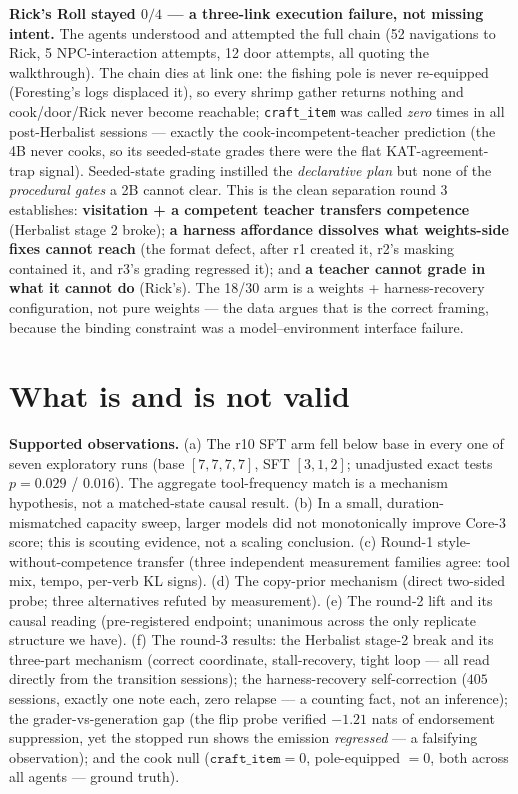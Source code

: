 \documentclass[11pt]{article}
\begin{document}
\textbf{Rick's Roll stayed $0/4$ --- a three-link execution failure, not missing intent.} The
agents understood and attempted the full chain (52 navigations to Rick, 5 NPC-interaction
attempts, 12 door attempts, all quoting the walkthrough). The chain dies at link one: the fishing
pole is never re-equipped (Foresting's logs displaced it), so every shrimp gather returns nothing
and cook/door/Rick never become reachable; \texttt{craft\_item} was called \emph{zero} times in
all post-Herbalist sessions --- exactly the cook-incompetent-teacher prediction (the 4B never
cooks, so its seeded-state grades there were the flat KAT-agreement-trap signal). Seeded-state
grading instilled the \emph{declarative plan} but none of the \emph{procedural gates} a 2B
cannot clear. This is the clean separation round 3 establishes: \textbf{visitation + a competent
teacher transfers competence} (Herbalist stage 2 broke); \textbf{a harness affordance dissolves
what weights-side fixes cannot reach} (the format defect, after r1 created it, r2's masking
contained it, and r3's grading regressed it); and \textbf{a teacher cannot grade in what it
cannot do} (Rick's). The 18/30 arm is a weights + harness-recovery configuration, not pure
weights --- the data argues that is the correct framing, because the binding constraint was a
model--environment interface failure.

\section{What is and is not valid}

\textbf{Supported observations.} (a) The r10 SFT arm fell below base in every one of seven
exploratory runs (base $[7,7,7,7]$, SFT $[3,1,2]$; unadjusted exact tests
$p{=}0.029$ / $0.016$). The aggregate tool-frequency match is a mechanism hypothesis, not a
matched-state causal result. (b) In a small, duration-mismatched capacity sweep, larger models did
not monotonically improve Core-3 score; this is scouting evidence, not a scaling conclusion.
(c) Round-1 style-without-competence transfer (three
independent measurement families agree: tool mix, tempo, per-verb KL signs). (d) The copy-prior
mechanism (direct two-sided probe; three alternatives refuted by measurement). (e) The round-2
lift and its causal reading (pre-registered endpoint; unanimous across the only replicate
structure we have). (f) The round-3 results: the Herbalist stage-2 break and its three-part
mechanism (correct coordinate, stall-recovery, tight loop --- all read directly from the
transition sessions); the harness-recovery self-correction ($405$ sessions, exactly one note
each, zero relapse --- a counting fact, not an inference); the grader-vs-generation gap (the flip
probe verified $-1.21$ nats of endorsement suppression, yet the stopped run shows the emission
\emph{regressed} --- a falsifying observation); and the cook null ($\texttt{craft\_item}=0$,
pole-equipped $=0$, both across all agents --- ground truth).
\end{document}
